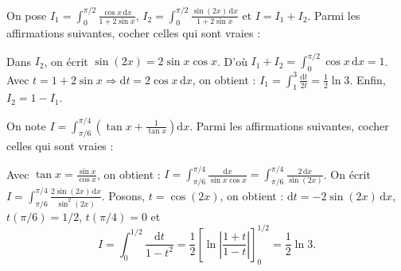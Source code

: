 \begin{question}
On pose $\displaystyle I_1=\int _{0}^{\pi/2}\frac{\cos x\,\mathrm{d}x}{1+2\sin x}$, $\displaystyle I_2=\int _{0}^{\pi/2}\frac{\sin (2x)\,\mathrm{d}x}{1+2\sin x}$ et $I=I_1+I_2$. Parmi les affirmations suivantes, cocher celles qui sont vraies :
\begin{answers}
\end{answers}
\vskip2mm
\begin{explanations}
Dans $I_2$, on écrit $\sin (2x)=2\sin x\cos x$. D'où $\displaystyle I_1+I_2=\int _{0}^{\pi/2}\cos x\,\mathrm{d}x=1$.
\vskip0mm
Avec $t=1+2\sin x\Rightarrow \mathrm{d}t=2\cos x\, \mathrm{d}x$, on obtient : $\displaystyle I_1=\int _{1}^{3}\frac{\mathrm{d}t}{2t}=\frac{1}{2}\ln 3$. Enfin, $I_2=1-I_1$.
\end{explanations}
\end{question}

\begin{question}
On note $\displaystyle I=\int _{\pi/6}^{\pi/4}\left(\tan x+\frac{1}{\tan x}\right)\mathrm{d}x$. Parmi les affirmations suivantes, cocher celles qui sont vraies :
\begin{answers}  
\end{answers}
\vskip3mm
\begin{explanations}
Avec $\displaystyle \tan x=\frac{\sin x}{\cos x}$, on obtient : $\displaystyle I=\int _{\pi/6}^{\pi/4}\frac{\mathrm{d}x}{\sin x\cos x}=\int _{\pi/6}^{\pi/4}\frac{2\, \mathrm{d}x}{\sin (2x)}$. On écrit $\displaystyle I=\int _{\pi/6}^{\pi/4}\frac{2\sin (2x)\, \mathrm{d}x}{\sin ^2(2x)}$. Posons, $t=\cos (2x)$, on obtient : $\mathrm{d}t=-2\sin (2x)\, \mathrm{d}x$, $t(\pi/6)=1/2$, $t(\pi/4)=0$ et
$$\displaystyle I=\int _{0}^{1/2}\frac{\mathrm{d}t}{1-t^2}=\frac{1}{2}\left[\ln \left|\frac{1+t}{1-t}\right|\right]_0^{1/2}=\frac{1}{2}\ln 3.$$
\end{explanations}
\end{question}


